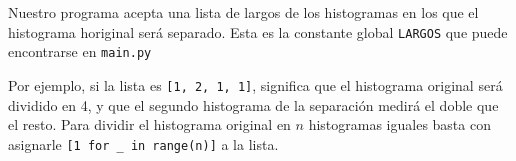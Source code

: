 Nuestro programa acepta una lista de largos de los histogramas en los que el histograma horiginal será separado.
Esta es la constante global \texttt{LARGOS} que puede encontrarse en \texttt{main.py}

Por ejemplo, si la lista es \texttt{[1, 2, 1, 1]}, significa que el histograma original será dividido en 4,
y que el segundo histograma de la separación medirá el doble que el resto.
Para dividir el histograma original en $n$ histogramas iguales basta con asignarle \texttt{[1 for \_ in range(n)]}
a la lista.
